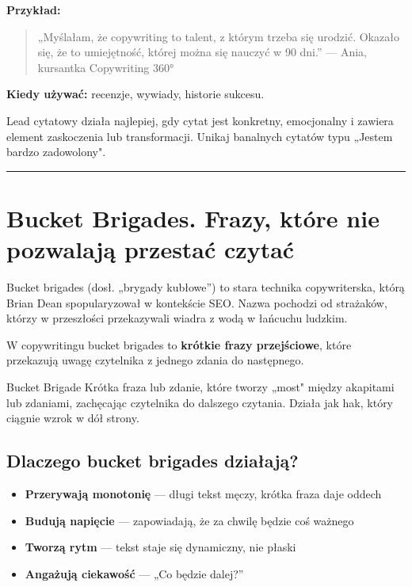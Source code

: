 \documentclass[
  12pt,
  a4paper,
  twoside,
  openright,
  12pt,
  DIV=12,
  BCOR=12mm]{scrbook}
\providecommand{\tightlist}{%
  \setlength{\itemsep}{0pt}\setlength{\parskip}{0pt}}\usepackage{longtable,booktabs,array}
\newcommand{\decoline}{%
  \begin{center}
    \textcolor{bordergray}{\rule{0.3\textwidth}{0.5pt}}
  \end{center}
}
\begin{document}
\textbf{Przykład:}

\begin{quote}
„Myślałam, że copywriting to talent, z którym trzeba się urodzić.
Okazało się, że to umiejętność, której można się nauczyć w 90 dni.'' ---
Ania, kursantka Copywriting 360°
\end{quote}

\textbf{Kiedy używać:} recenzje, wywiady, historie sukcesu.

\begin{wskazowka}
Lead cytatowy działa najlepiej, gdy cytat jest konkretny, emocjonalny i zawiera element zaskoczenia lub transformacji. Unikaj banalnych cytatów typu „Jestem bardzo zadowolony".
\end{wskazowka}

\decoline

\section{Bucket Brigades. Frazy, które nie pozwalają przestać
czytać}\label{bucket-brigades.-frazy-ktuxf3re-nie-pozwalajux105-przestaux107-czytaux107}

Bucket brigades (dosł. „brygady kubłowe'') to stara technika
copywriterska, którą Brian Dean spopularyzował w kontekście SEO. Nazwa
pochodzi od strażaków, którzy w przeszłości przekazywali wiadra z wodą w
łańcuchu ludzkim.

W copywritingu bucket brigades to \textbf{krótkie frazy przejściowe},
które przekazują uwagę czytelnika z jednego zdania do następnego.

\begin{pojecie}{Bucket Brigade}
Krótka fraza lub zdanie, które tworzy „most" między akapitami lub zdaniami, zachęcając czytelnika do dalszego czytania. Działa jak hak, który ciągnie wzrok w dół strony.
\end{pojecie}

\subsection{Dlaczego bucket brigades
działają?}\label{dlaczego-bucket-brigades-dziaux142ajux105}

\begin{itemize}
\tightlist
\item
  \textbf{Przerywają monotonię} --- długi tekst męczy, krótka fraza daje
  oddech
\item
  \textbf{Budują napięcie} --- zapowiadają, że za chwilę będzie coś
  ważnego
\item
  \textbf{Tworzą rytm} --- tekst staje się dynamiczny, nie płaski
\item
  \textbf{Angażują ciekawość} --- „Co będzie dalej?''
\end{itemize}
\end{document}
